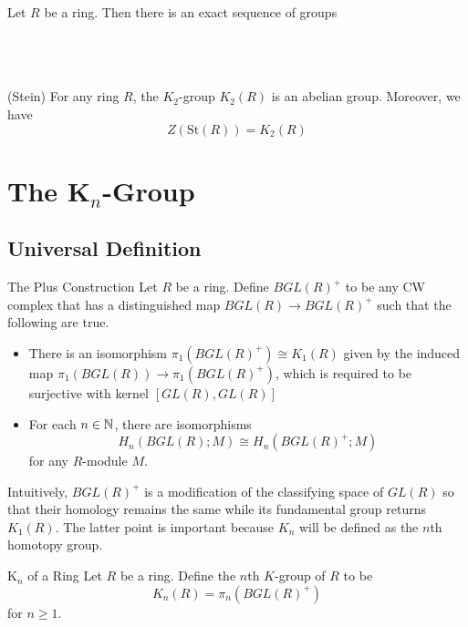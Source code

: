 \documentclass[a4paper]{article}
\begin{document}
\begin{lmm}{}{} Let $R$ be a ring. Then there is an exact sequence of groups \\~\\
\\~\\
\end{lmm}

\begin{thm}{(Stein)}{} For any ring $R$, the $K_2$-group $K_2(R)$ is an abelian group. Moreover, we have $$Z(\text{St}(R))=K_2(R)$$
\end{thm}

\pagebreak
\section{The K${_n}$-Group}
\subsection{Universal Definition}
\begin{defn}{The Plus Construction}{} Let $R$ be a ring. Define $BGL(R)^+$ to be any CW complex that has a distinguished map $BGL(R)\to BGL(R)^+$ such that the following are true. 
\begin{itemize}
\item There is an isomorphism $\pi_1(BGL(R)^+)\cong K_1(R)$ given by the induced map $\pi_1(BGL(R))\to\pi_1(BGL(R)^+)$, which is required to be surjective with kernel $[GL(R),GL(R)]$
\item For each $n\in\mathbb{N}$, there are isomorphisms $$H_n(BGL(R);M)\cong H_n(BGL(R)^+;M)$$ for any $R$-module $M$. 
\end{itemize}
\end{defn}

Intuitively, $BGL(R)^+$ is a modification of the classifying space of $GL(R)$ so that their homology remains the same while its fundamental group returns $K_1(R)$. The latter point is important because $K_n$ will be defined as the $n$th homotopy group. 

\begin{defn}{K${_n}$ of a Ring}{} Let $R$ be a ring. Define the $n$th $K$-group of $R$ to be $$K_n(R)=\pi_n(BGL(R)^+)$$ for $n\geq 1$. 
\end{defn}
\end{document}
